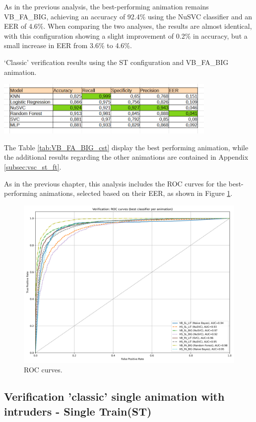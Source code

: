 \documentclass[12pt]{report}
\begin{document}
As in the previous analysis, the best-performing animation remains VB\_FA\_BIG, achieving an accuracy of 92.4\% using the NuSVC classifier and an EER of 4.6\%.
When comparing the two analyses, the results are almost identical, with this configuration showing a slight improvement of 0.2\% in accuracy, but a small increase in EER from 3.6\% to 4.6\%.

\begin{table}[ht]
    \centering
    \caption{‘Classic’ verification results using the ST configuration and VB\_FA\_BIG animation.}
    \includegraphics[width=0.8\textwidth]{Images/Results/Classic_procedure/Verification_single/st/VB_FA_BIG.png}
    \label{tab:VB_FA_BIG_cst}
\end{table}

The Table \ref{tab:VB_FA_BIG_cst} display the best performing animation, while the additional results regarding the other animations are contained in Appendix \ref{subsec:vsc_st_ft}.

As in the previous chapter, this analysis includes the ROC curves for the best-performing animations, selected based on their EER, as shown in Figure \ref{fig:roc_cst}.

\begin{figure}[ht]
    \centering
    \includegraphics[width = 0.6
    \textwidth]{Images/Results/Classic_procedure/Verification_single/st/Verification_single_roc_classic_st.png}
    \caption{ROC curves.}
    \label{fig:roc_cst}
\end{figure}
\FloatBarrier


\subsection{Verification 'classic' single animation with intruders - Single Train(ST)}
\end{document}
